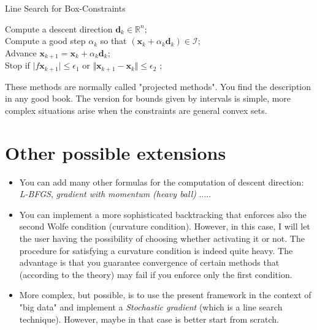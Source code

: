 \documentclass{article}
\begin{document}
 \begin{algorithm}
     \caption{Line Search for Box-Constraints}
     Compute a descent direction $\mathbf{d}_k\in\mathbb{R}^n$;\\
     Compute a good step $\alpha_k$ so that $(\mathbf{x}_k+\alpha_k\mathbf{d}_k)\in\mathcal{I}$;\\
     Advance $\mathbf{x}_{k+1}=\mathbf{x}_k+\alpha_k\mathbf{d}_k$;\\
     Stop if $\vert f\mathbf{x}_{k+1}\vert\le\epsilon_1$ or $\Vert \mathbf{x}_{k+1}-\mathbf{x}_k\Vert\le\epsilon_2$ ;\\
 \end{algorithm}

These methods are normally called "projected methods". You find the description in any good book. The version for bounds given by intervals is simple, more  complex situations arise when the constraints are general convex sets.

\section{Other possible extensions}
\begin{itemize}
    \item You can add many other formulas for the computation of descent direction: \emph{L-BFGS}, \emph{gradient with momentum (heavy ball)} ..... 
    \item You can implement a more sophisticated backtracking that enforces also the second Wolfe condition (curvature condition). However, in this case, I will let the user having the possibility of choosing whether activating it or not. The procedure for satisfying a curvature condition is indeed
    quite heavy. The advantage is that you guarantee convergence of certain methods that (according to the theory) may fail if you enforce only the first condition.
    \item More complex, but possible, is to use the present framework in the context of "big data" and implement a \emph{Stochastic gradient} (which is a line search technique). However, maybe in that case is better start from scratch. 
\end{itemize}

 

  
\end{document}
